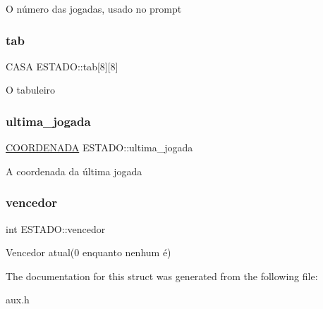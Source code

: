 O número das jogadas, usado no prompt \mbox{\label{structESTADO_ab56f0f1be16954d3768b4174d14c087d}} 
\subsubsection{\texorpdfstring{tab}{tab}}
{\footnotesize\ttfamily C\+A\+SA E\+S\+T\+A\+D\+O\+::tab\mbox{[}8\mbox{]}\mbox{[}8\mbox{]}}

O tabuleiro \mbox{\label{structESTADO_a4896a5c5c1f40b43fb795623327e3f47}} 
\subsubsection{\texorpdfstring{ultima\+\_\+jogada}{ultima\_jogada}}
{\footnotesize\ttfamily \hyperlink{structCOORDENADA}{C\+O\+O\+R\+D\+E\+N\+A\+DA} E\+S\+T\+A\+D\+O\+::ultima\+\_\+jogada}

A coordenada da última jogada \mbox{\label{structESTADO_afa5918b4f2221416965663d44b14e179}} 
\subsubsection{\texorpdfstring{vencedor}{vencedor}}
{\footnotesize\ttfamily int E\+S\+T\+A\+D\+O\+::vencedor}

Vencedor atual(0 enquanto nenhum é) 

The documentation for this struct was generated from the following file\+:\begin{DoxyCompactItemize}
\item 
aux.\+h\end{DoxyCompactItemize}
